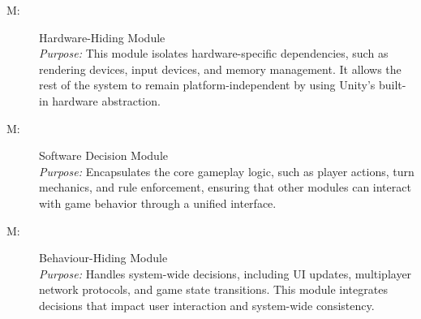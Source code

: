 \documentclass[12pt, titlepage]{article}
\newcounter{mnum}
\newcommand{\mthemnum}{M\themnum}
\begin{document}
\begin{description}
\item [ \mthemnum \label{mHH}:] Hardware-Hiding Module \\
  \textit{Purpose:} This module isolates hardware-specific dependencies, such as rendering devices, input devices, and memory management. It allows the rest of the system to remain platform-independent by using Unity's built-in hardware abstraction.
  
\item [ \mthemnum \label{mBH}:] Software Decision Module \\
  \textit{Purpose:} Encapsulates the core gameplay logic, such as player actions, turn mechanics, and rule enforcement, ensuring that other modules can interact with game behavior through a unified interface.

\item [ \mthemnum \label{mSD}:] Behaviour-Hiding Module \\
  \textit{Purpose:} Handles system-wide decisions, including UI updates, multiplayer network protocols, and game state transitions. This module integrates decisions that impact user interaction and system-wide consistency.

\end{description}
\end{document}
